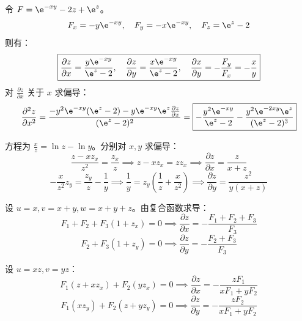 \begin{solution}
    令 $F = \e^{-xy} - 2z + \e^z$。
    \begin{equation}
        F_x = -y \e^{-xy}, \quad F_y = -x \e^{-xy}, \quad F_z = \e^z - 2
    \end{equation}
    则有：
    \begin{equation}
        \boxed{\frac{\partial z}{\partial x} = \frac{y \e^{-xy}}{\e^z - 2}, \quad \frac{\partial z}{\partial y} = \frac{x \e^{-xy}}{\e^z - 2}, \quad \frac{\partial x}{\partial y} = -\frac{F_y}{F_x} = -\frac{x}{y}}
    \end{equation}
    对 $\frac{\partial z}{\partial x}$ 关于 $x$ 求偏导：
    \begin{equation}
        \frac{\partial^2 z}{\partial x^2} = \frac{-y^2 \e^{-xy}(\e^z - 2) - y \e^{-xy} \e^z \frac{\partial z}{\partial x}}{(\e^z - 2)^2} = \boxed{-\frac{y^2 \e^{-xy}}{\e^z - 2} - \frac{y^2 \e^{-2xy} \e^z}{(\e^z - 2)^3}}
    \end{equation}

    方程为 $\frac{x}{z} = \ln z - \ln y$。分别对 $x, y$ 求偏导：
    \begin{equation}
        \frac{z - x z_x}{z^2} = \frac{z_x}{z} \implies z - x z_x = z z_x \implies \boxed{\frac{\partial z}{\partial x} = \frac{z}{x + z}}
    \end{equation}
    \begin{equation}
        -\frac{x}{z^2} z_y = \frac{z_y}{z} - \frac{1}{y} \implies \frac{1}{y} = z_y \left(\frac{1}{z} + \frac{x}{z^2}\right) \implies \boxed{\frac{\partial z}{\partial y} = \frac{z^2}{y(x + z)}}
    \end{equation}

    设 $u=x, v=x+y, w=x+y+z$。由复合函数求导：
    \begin{equation}
        F_1 + F_2 + F_3 (1 + z_x) = 0 \implies \boxed{\frac{\partial z}{\partial x} = -\frac{F_1 + F_2 + F_3}{F_3}}
    \end{equation}
    \begin{equation}
        F_2 + F_3 (1 + z_y) = 0 \implies \boxed{\frac{\partial z}{\partial y} = -\frac{F_2 + F_3}{F_3}}
    \end{equation}

    设 $u=xz, v=yz$：
    \begin{equation}
        F_1 (z + x z_x) + F_2 (y z_x) = 0 \implies \boxed{\frac{\partial z}{\partial x} = -\frac{z F_1}{x F_1 + y F_2}}
    \end{equation}
    \begin{equation}
        F_1 (x z_y) + F_2 (z + y z_y) = 0 \implies \boxed{\frac{\partial z}{\partial y} = -\frac{z F_2}{x F_1 + y F_2}}
    \end{equation}
\end{solution}

